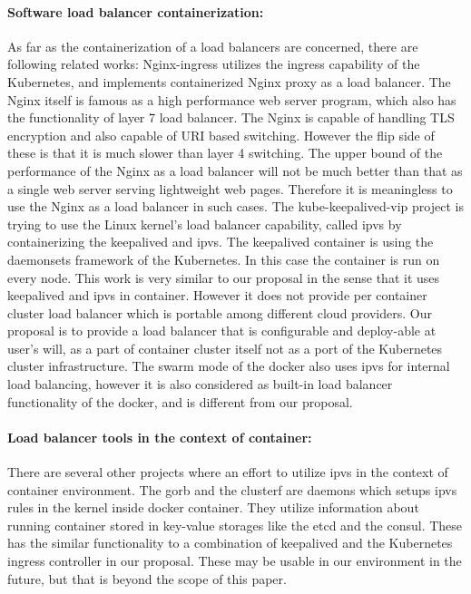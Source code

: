 \paragraph{\bf Software load balancer containerization:}
As far as the containerization of a load balancers are concerned, there are following related works:
Nginx-ingress\cite{Pleshakov2016,NginxInc2016} utilizes the ingress\cite{K8sIngress2017} capability of the Kubernetes, 
and implements containerized Nginx proxy as a load balancer. The Nginx itself is famous as a high performance web server program,
which also has the functionality of layer 7 load balancer. The Nginx is capable of handling TLS encryption and also capable of  
URI based switching. However the flip side of these is that it is much slower than layer 4 switching.
The upper bound of the performance of the Nginx as a load balancer will not be much better than 
that as a single web server serving lightweight web pages. 
Therefore it is meaningless to use the Nginx as a load balancer in such cases.
The kube-keepalived-vip\cite{Prashanth2016} project is trying to use the Linux kernel's load balancer capability, 
called ipvs\cite{Zhang2000} by containerizing the keepalived\cite{ACassen2016} and ipvs. 
The keepalived container is using the daemonsets\cite{K8sDaemonsets2017} framework of the Kubernetes. 
In this case the container is run on every node.
This work is very similar to our proposal in the sense that it uses keepalived and ipvs in container. 
However it does not provide per container cluster load balancer which is portable among different cloud providers.   
Our proposal is to provide a load balancer that is configurable and deploy-able at user's will,
 as a part of container cluster itself not as a port of the Kubernetes cluster infrastructure.  
The swarm mode of the docker\cite{DockerCoreEngineering2016,DockerInc2017} also uses ipvs for internal load balancing,
however it is also considered as built-in load balancer functionality of the docker, 
and is different from our proposal.

\paragraph{\bf Load balancer tools in the context of container:}
There are several other projects where an effort to utilize ipvs in the context of container environment.
The gorb\cite{Sibiryov2015} and the clusterf\cite{Aaltodoc:http://urn.fi/URN:NBN:fi:aalto-201611025433} are daemons 
which setups ipvs rules in the kernel inside docker container. They utilize information about running container stored in key-value storages
like the etcd\cite{CoreOSEtcd} and the consul\cite{HashiCorpConsul}. 
These has the similar functionality to a combination of keepalived and the Kubernetes ingress controller in our proposal.
These may be usable in our environment in the future, but that is beyond the scope of this paper.

